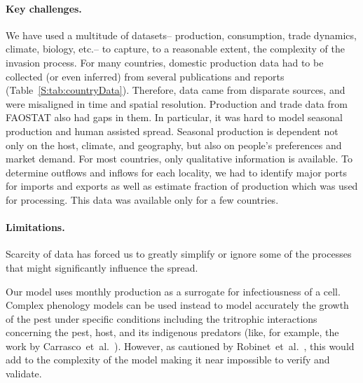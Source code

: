 \documentclass[11pt]{article}
\theoremstyle{definition}
\begin{document}
\paragraph{Key challenges.}
We have used a multitude of datasets-- production, consumption, trade
dynamics, climate, biology, etc.-- to capture, to a reasonable extent, the
complexity of the invasion process.  For many countries, domestic
production data had to be collected (or even inferred) from several
publications and reports (Table~\ref{S:tab:countryData}). Therefore, data
came from disparate sources, and were misaligned in time and spatial
resolution. Production and trade data from FAOSTAT also had gaps in them.
In particular, it was hard to model seasonal production and human assisted
spread. Seasonal production is dependent not only on the host, climate, and
geography, but also on people's preferences and market demand. For most
countries, only qualitative information is available.
To determine outflows and inflows for each locality,
we had to identify major ports for imports and exports as well as estimate
fraction of production which was used for processing. This data was
available only for a few countries.

\paragraph{Limitations.}
Scarcity of data has forced us to greatly simplify or ignore some of the
processes that might significantly influence the spread. 

Our model uses monthly production as a surrogate for infectiousness of a
cell. Complex phenology models can be used instead to model accurately the
growth of the pest under specific conditions including the tritrophic
interactions concerning the pest, host, and its indigenous predators (like,
for example, the work by Carrasco~et~al.~\cite{carrasco2010unveiling}).
However, as cautioned by Robinet~et~al.~\cite{robinet2012suite}, this would
add to the complexity of the model making it near impossible to verify and
validate.
\end{document}

